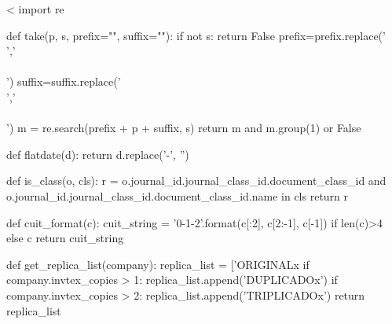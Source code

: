 \documentclass{article}
\begin{document}
<%
    import re

    def take(p, s, prefix="", suffix=""):
        if not s: return False
	prefix=prefix.replace('\\','\\\\')
	suffix=suffix.replace('\\','\\\\')
        m = re.search(prefix + p + suffix, s)
        return m and m.group(1) or False

    def flatdate(d):
        return d.replace('-', '')

    def is_class(o, cls):
        r = o.journal_id.journal_class_id.document_class_id and o.journal_id.journal_class_id.document_class_id.name in cls
        return r

    def cuit_format(c):
	cuit_string = '{0}-{1}-{2}'.format(c[:2], c[2:-1], c[-1]) if len(c)>4 else c
        return cuit_string

    def get_replica_list(company):
	replica_list = ['ORIGINALx %
	if company.invtex_copies > 1:
	   replica_list.append('DUPLICADOx')
	if company.invtex_copies > 2:
	   replica_list.append('TRIPLICADOx')
	return replica_list



\end{document}
